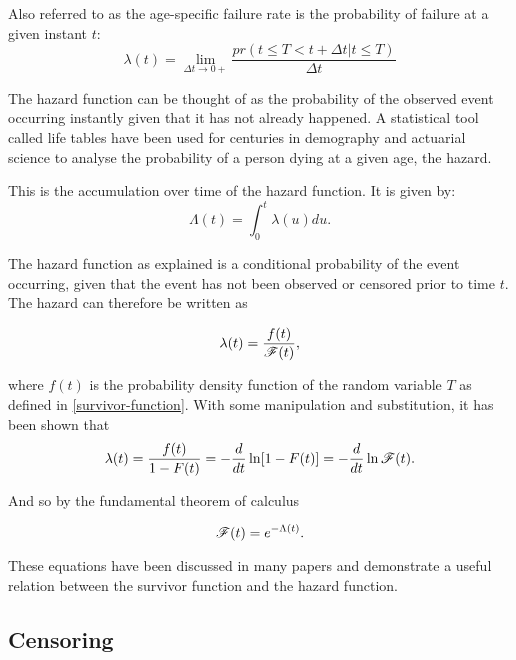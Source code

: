 \begin{definition}
Also referred to as the age-specific failure rate is the probability of failure at a given instant $t$:
\begin{equation}
    \lambda(t)=\lim_{\Delta t \xrightarrow{} 0+}\frac{pr(t\leq T < t+\Delta t | t\leq T)}{\Delta t}
\end{equation}
\end{definition}

The hazard function can be thought of as the probability of the observed event occurring instantly given that it has not already happened. A statistical tool called life tables have been used for centuries in demography and actuarial science to analyse the probability of a person dying at a given age, the hazard.

\begin{definition}
This is the accumulation over time of the hazard function. It is given by:
\begin{equation}
    \Lambda(t)=\int_0^t \lambda(u)du.
\end{equation}
\end{definition}

The hazard function as explained is a conditional probability of the event occurring, given that the event has not been observed or censored prior to time $t$. The hazard can therefore be written as

\begin{equation}
    \lambda(t) = \frac{f(t)}{\mathscr{F}(t)},
\end{equation}

where $f(t)$ is the probability density function of the random variable $T$ as defined in \ref{survivor-function}. With some manipulation and substitution, it has been shown that
\begin{equation}
    \lambda(t) = \frac{f(t)}{1-F(t)}
    = -\frac{d}{dt}\ln[1-F(t)]
    = -\frac{d}{dt}\ln\mathscr{F}(t).
\end{equation}

And so by the fundamental theorem of calculus

\begin{equation}
    \mathscr{F}(t) = e^{-\Lambda(t)}.
\end{equation}

These equations have been discussed in many papers and demonstrate a useful relation between the survivor function and the hazard function.

\subsection{Censoring}

